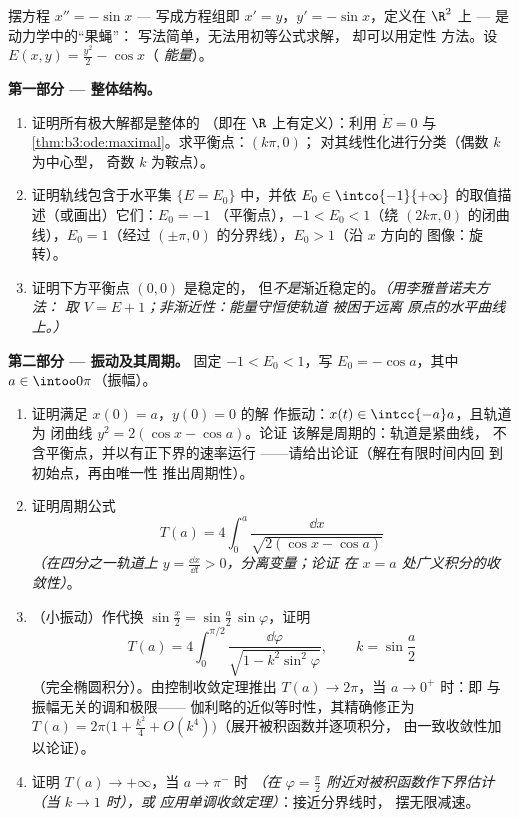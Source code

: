 \begin{problem}\label{pb:b3:ode:1}
摆方程 $x'' = -\sin x$ --- 写成方程组即 $x' =
y$，$y' = -\sin x$，定义在 $\R^2$ 上 --- 是动力学中的“果蝇”：
写法简单，无法用初等公式求解，
却可以用定性
方法。设 $E(x, y) = \frac{y^2}2 - \cos x$（
\emph{能量}）。

\medskip
\noindent\textbf{第一部分 --- 整体结构。}
\begin{enumerate}
  \item 证明所有极大解都是整体的
        （即在 $\R$ 上有定义）：利用 $\dot E = 0$ 与
        \cref{thm:b3:ode:maximal}。求平衡点：$(k\pi, 0)$；
        对其线性化进行分类（偶数 $k$ 为中心型，
        奇数 $k$ 为鞍点）。
  \item 证明轨线包含于水平集
        $\{E = E_0\}$ 中，并依
        $E_0 \in \intco{-1}{+\infty}$ 的取值描述（或画出）它们：$E_0 = -1$
        （平衡点），$-1 < E_0 < 1$（绕
        $(2k\pi, 0)$ 的闭曲线），$E_0 = 1$（经过
        $(\pm\pi, 0)$ 的分界线），$E_0 > 1$（沿 $x$ 方向的
        图像：旋转）。
  \item 证明下方平衡点 $(0,0)$ 是稳定的，
        但\emph{不是}渐近稳定的。\emph{（用李雅普诺夫方法：
        取 $V = E + 1$；非渐近性：能量守恒使轨道
        被困于远离
        原点的水平曲线上。）}
\end{enumerate}

\medskip
\noindent\textbf{第二部分 --- 振动及其周期。}
固定 $-1 < E_0 < 1$，写 $E_0 = -\cos a$，其中 $a \in
\intoo0\pi$（振幅）。
\begin{enumerate}[resume]
  \item 证明满足 $x(0) = a$，$y(0) = 0$ 的解
        作振动：$x(t) \in \intcc{-a}a$，且轨道为
        闭曲线 $y^2 = 2(\cos x - \cos a)$。论证
        该解是周期的：轨道是紧曲线，
        不含平衡点，并以有正下界的速率运行
        ——请给出论证（解在有限时间内回
        到初始点，再由唯一性
        推出周期性）。
  \item 证明周期公式
        \[
        T(a) = 4\int_0^{a}\frac{\dd x}{\sqrt{2(\cos x -
        \cos a)}}
        \]
        \emph{（在四分之一轨道上 $y = \frac{\dd x}{\dd t} >
        0$，分离变量；论证
        在 $x = a$ 处广义积分的收敛性）}。
  \item （小振动）作代换 $\sin\frac x2 =
        \sin\frac a2\,\sin\varphi$，证明
        \[
        T(a) = 4\int_0^{\pi/2}\frac{\dd\varphi}{\sqrt{1 -
        k^2\sin^2\varphi}},
        \qquad k = \sin\frac a2
        \]
        （完全椭圆积分）。由控制收敛定理推出
        $T(a) \to 2\pi$，当 $a \to 0^+$ 时：即
        与振幅无关的调和极限——
        伽利略的近似等时性，其精确修正为
        $T(a) = 2\pi\bigl(1 + \frac{k^2}4 +
        O(k^4)\bigr)$（展开被积函数并逐项积分，
        由一致收敛性加以论证）。
  \item 证明 $T(a) \to +\infty$，当 $a \to \pi^-$ 时
        \emph{（在 $\varphi =
        \frac\pi2$ 附近对被积函数作下界估计（当 $k \to 1$ 时），或
        应用单调收敛定理）}：接近分界线时，
        摆无限减速。
\end{enumerate}


\end{problem}
